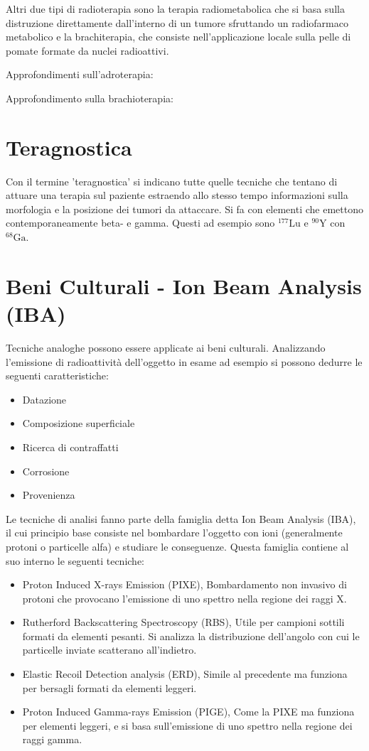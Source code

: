 Altri due tipi di radioterapia sono la terapia radiometabolica che si basa sulla distruzione direttamente dall'interno di un tumore sfruttando un radiofarmaco metabolico e la brachiterapia, che consiste nell'applicazione locale sulla pelle di pomate formate da nuclei radioattivi.

Approfondimenti sull'adroterapia: \cite{Rossi} \cite{Braccini} \cite{ADRO} \cite{Boron} \cite{Acceleratori_adronterapia} \cite{LINAC}

Approfondimento sulla brachioterapia: \cite{Brachioterapia}

\section{Teragnostica}

Con il termine 'teragnostica' si indicano tutte quelle tecniche che tentano di attuare una terapia sul paziente estraendo allo stesso tempo informazioni sulla morfologia e la posizione dei tumori da attaccare. 
Si fa con elementi che emettono contemporaneamente beta- e gamma. Questi ad esempio sono $^{177}\text{Lu}$ e $^{90}\text{Y}$ con $^{68}\text{Ga}$.

\section{Beni Culturali - Ion Beam Analysis (IBA)}

Tecniche analoghe possono essere applicate ai beni culturali. Analizzando l'emissione di radioattività dell'oggetto in esame ad esempio si possono dedurre le seguenti caratteristiche: 

\begin{itemize}
\item Datazione
\item Composizione superficiale
\item Ricerca di contraffatti
\item Corrosione
\item Provenienza
\end{itemize}

Le tecniche di analisi fanno parte della famiglia detta Ion Beam Analysis (IBA), il cui principio base consiste nel bombardare l'oggetto con ioni (generalmente protoni o particelle alfa) e studiare le conseguenze. Questa famiglia contiene al suo interno le seguenti tecniche:
\begin{itemize}
\item Proton Induced X-rays Emission (PIXE), Bombardamento non invasivo di protoni che provocano l'emissione di uno spettro nella regione dei raggi X.
\item Rutherford Backscattering Spectroscopy (RBS), Utile per campioni sottili formati da elementi pesanti. Si analizza la distribuzione dell'angolo con cui le particelle inviate scatterano all'indietro.
\item Elastic Recoil Detection analysis (ERD), Simile al precedente ma funziona per bersagli formati da elementi leggeri.
\item Proton Induced Gamma-rays Emission (PIGE), Come la PIXE ma funziona per elementi leggeri, e si basa sull'emissione di uno spettro nella regione dei raggi gamma.
\end{itemize}

